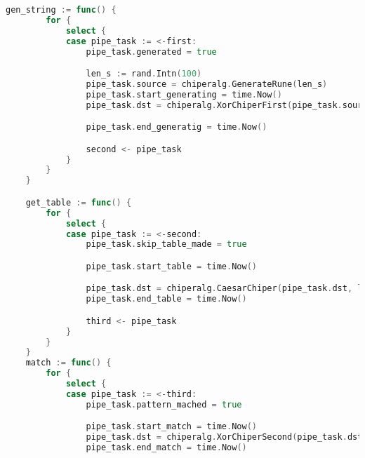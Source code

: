 \begin{lstlisting}[language=Go, label=lst:alg:Parallel1, caption=Реализация параллельного конвейера]
    gen_string := func() {
        for {
            select {
            case pipe_task := <-first:
                pipe_task.generated = true

                len_s := rand.Intn(100)
                pipe_task.source = chiperalg.GenerateRune(len_s)
                pipe_task.start_generating = time.Now()
                pipe_task.dst = chiperalg.XorChiperFirst(pipe_task.source, len_s)

                pipe_task.end_generatig = time.Now()

                second <- pipe_task
            }
        }
    }

    get_table := func() {
        for {
            select {
            case pipe_task := <-second:
                pipe_task.skip_table_made = true

                pipe_task.start_table = time.Now()

                pipe_task.dst = chiperalg.CaesarChiper(pipe_task.dst, len(pipe_task.dst))
                pipe_task.end_table = time.Now()

                third <- pipe_task
            }
        }
    }
    match := func() {
        for {
            select {
            case pipe_task := <-third:
                pipe_task.pattern_mached = true

                pipe_task.start_match = time.Now()
                pipe_task.dst = chiperalg.XorChiperSecond(pipe_task.dst, len(pipe_task.dst))
                pipe_task.end_match = time.Now()
\end{lstlisting}

